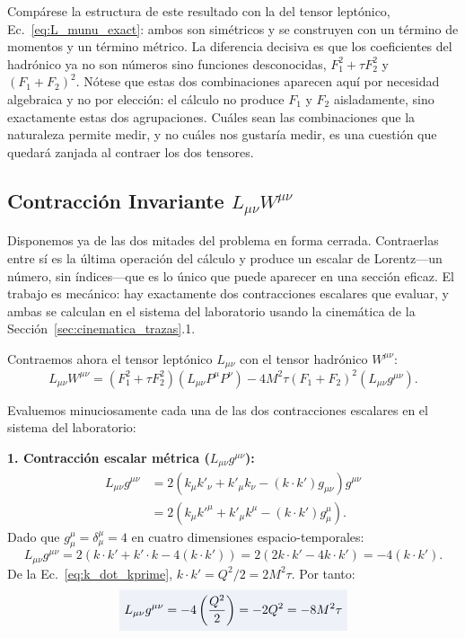 \documentclass[10pt,a4paper]{article}
\newcommand{\dest}[1]{{\setlength{\fboxsep}{4pt}\colorbox{colordest}{$\displaystyle #1$}}}
\begin{document}
Compárese la estructura de este resultado con la del tensor leptónico, Ec.~\eqref{eq:L_munu_exact}: ambos son simétricos y se construyen con un término de momentos y un término métrico. La diferencia decisiva es que los coeficientes del hadrónico ya no son números sino funciones desconocidas, $F_1^2 + \tau F_2^2$ y $(F_1+F_2)^2$. Nótese que estas dos combinaciones aparecen aquí por necesidad algebraica y no por elección: el cálculo no produce $F_1$ y $F_2$ aisladamente, sino exactamente estas dos agrupaciones. Cuáles sean las combinaciones que la naturaleza permite medir, y no cuáles nos gustaría medir, es una cuestión que quedará zanjada al contraer los dos tensores.

\subsection{Contracción Invariante \texorpdfstring{$L_{\mu\nu} W^{\mu\nu}$}{L\_munu W\^munu}}
Disponemos ya de las dos mitades del problema en forma cerrada. Contraerlas entre sí es la última operación del cálculo y produce un escalar de Lorentz---un número, sin índices---que es lo único que puede aparecer en una sección eficaz. El trabajo es mecánico: hay exactamente dos contracciones escalares que evaluar, y ambas se calculan en el sistema del laboratorio usando la cinemática de la Sección~\ref{sec:cinematica_trazas}.1.

Contraemos ahora el tensor leptónico $L_{\mu\nu}$ con el tensor hadrónico $W^{\mu\nu}$:
\begin{equation}
L_{\mu\nu} W^{\mu\nu} = (F_1^2 + \tau F_2^2) (L_{\mu\nu} P^\mu P^\nu) - 4 M^2 \tau (F_1 + F_2)^2 (L_{\mu\nu} g^{\mu\nu}).
\label{eq:LW_master}
\end{equation}

Evaluemos minuciosamente cada una de las dos contracciones escalares en el sistema del laboratorio:

\textbf{1. Contracción escalar métrica ($L_{\mu\nu} g^{\mu\nu}$):}
\begin{align}
L_{\mu\nu} g^{\mu\nu} &= 2 \left( k_\mu k'_\nu + k'_\mu k_\nu - (k \cdot k') g_{\mu\nu} \right) g^{\mu\nu} \nonumber \\
&= 2 \left( k_\mu k'^\mu + k'_\mu k^\mu - (k \cdot k') g_\mu^\mu \right).
\end{align}
Dado que $g_\mu^\mu = \delta_\mu^\mu = 4$ en cuatro dimensiones espacio-temporales:
\begin{equation}
L_{\mu\nu} g^{\mu\nu} = 2 \left( k \cdot k' + k' \cdot k - 4 (k \cdot k') \right) = 2 \left( 2 k \cdot k' - 4 k \cdot k' \right) = -4 (k \cdot k').
\end{equation}
De la Ec.~\eqref{eq:k_dot_kprime}, $k \cdot k' = Q^2/2 = 2 M^2 \tau$. Por tanto:
\begin{equation}
\dest{L_{\mu\nu} g^{\mu\nu} = -4 \left(\frac{Q^2}{2}\right) = -2 Q^2 = -8 M^2 \tau}
\label{eq:L_dot_g}
\end{equation}
\end{document}
